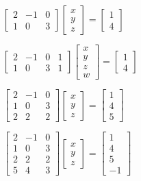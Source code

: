 \documentclass{article}
\begin{document}
$\left[ 
\begin{array}{rrr}
2 & -1 & 0 \\ 
1 & 0 & 3%
\end{array}%
\right] \left[ 
\begin{array}{c}
x \\ 
y \\ 
z%
\end{array}%
\right] =\left[ 
\begin{array}{c}
1 \\ 
4%
\end{array}%
\right] $

$\left[ 
\begin{array}{rrrc}
2 & -1 & 0 & 1 \\ 
1 & 0 & 3 & 1%
\end{array}%
\right] \left[ 
\begin{array}{c}
x \\ 
y \\ 
z \\ 
w%
\end{array}%
\right] =\left[ 
\begin{array}{c}
1 \\ 
4%
\end{array}%
\right] $

$\left[ 
\begin{array}{rrr}
2 & -1 & 0 \\ 
1 & 0 & 3 \\ 
2 & 2 & 2%
\end{array}%
\right] \left[ 
\begin{array}{c}
x \\ 
y \\ 
z%
\end{array}%
\right] =\left[ 
\begin{array}{c}
1 \\ 
4 \\ 
5%
\end{array}%
\right] $

$\left[ 
\begin{array}{rrr}
2 & -1 & 0 \\ 
1 & 0 & 3 \\ 
2 & 2 & 2 \\ 
5 & 4 & 3%
\end{array}%
\right] \left[ 
\begin{array}{c}
x \\ 
y \\ 
z%
\end{array}%
\right] =\left[ 
\begin{array}{c}
1 \\ 
4 \\ 
5 \\ 
-1%
\end{array}%
\right] $
\end{document}
